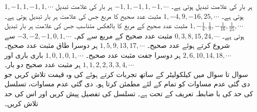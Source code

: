 $1,-1,1,-1,1,\cdots$\quad
ہر بار  کی علامت تبدیل ہوتی ہے۔
$-1,1,-1,1,-1,\cdots$\quad
ہر بار  کی علامت تبدیل ہوتی ہے۔
$1,-4,9,-16,25,\cdots$\quad
مثبت عدد صحیح کا مربع جس کی علامت ہر بار تبدیل ہوتی ہے۔ 
$1,-\frac{1}{4},\frac{1}{9},-\frac{1}{16},\frac{1}{25},\cdots$\quad
مثبت عدد صحیح کے مربع کا بالعکس متناسب جس کی علامت ہر بار تبدیل ہوتی ہے۔
$0,3,8,15,24,\cdots$\quad
مثبت عدد صحیح کے مربع سے  کم۔
$-3,-2,-1,0,1,\cdots$\quad
{} سے شروع کرتے ہوئے عدد صحیح۔
$1,5,9,13,17,\cdots$\quad
ہر دوسرا طاق مثبت عدد صحیح۔
$2,6,10,14,18,\cdots$\quad
ہر دوسرا جفت مثبت عدد صحیح۔
$1,0,1,0,1,\cdots$\quad
باری باری  اور 
$1,1,2,2,3,3,4,\cdots$\quad
ہر مثبت عدد صحیح دو بار۔
\\
سوال  تا سوال  میں کیلکولیٹر کے  ساتھ تجربات کرتے ہوئے  کی وہ قیمت تلاش کریں جو دی گئی عدم مساوات کو تمام  کے لئے مطمئن کرتا ہو۔ دی گئی عدم مساوات، تسلسل کی حد کی با ضابطہ تعریف کے تحت ہے۔ تسلسل کی تفصیل پیش کریں اور اس کی حد تلاش کریں۔

